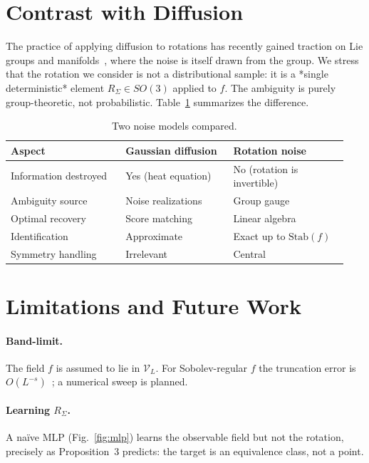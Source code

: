 \documentclass[11pt,a4paper]{article}
\theoremstyle{remark}
\begin{document}
\section{Contrast with Diffusion}
The practice of applying diffusion to rotations has recently gained
traction on Lie groups and manifolds~\citep{leach2022diffusion,yim2023unified,radm2025,equivdiffa5_2025},
where the noise is itself drawn from the group. We stress that the
rotation we consider is not a distributional sample: it is a *single
deterministic* element $R_\Sigma\in SO(3)$ applied to $f$. The ambiguity is
purely group-theoretic, not probabilistic. Table~\ref{tab:contrast}
summarizes the difference.
\begin{table}[ht]
\centering
\begin{tabular}{p{0.32\linewidth}p{0.30\linewidth}p{0.32\linewidth}}
\toprule
Aspect & Gaussian diffusion & Rotation noise \\
\midrule
Information destroyed & Yes (heat equation) & No (rotation is invertible) \\
Ambiguity source      & Noise realizations  & Group gauge \\
Optimal recovery      & Score matching      & Linear algebra \\
Identification        & Approximate         & Exact up to $\mathrm{Stab}(f)$ \\
Symmetry handling     & Irrelevant          & Central \\
\bottomrule
\end{tabular}
\caption{Two noise models compared.}
\label{tab:contrast}
\end{table}

\section{Limitations and Future Work}
\paragraph{Band-limit.} The field $f$ is assumed to lie in $\mathcal{V}_L$.
For Sobolev-regular $f$ the truncation error is $O(L^{-s})$~\citep{lychagin2021metric};
a numerical sweep is planned.

\paragraph{Learning $R_\Sigma$.} A naïve MLP (Fig.~\ref{fig:mlp}) learns
the observable field but not the rotation, precisely as
Proposition~3 predicts: the target is an equivalence class, not a point.
\end{document}
